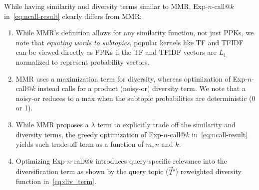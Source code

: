 While having similarity and diversity terms similar to MMR,
Exp-$n$-call@$k$ in~\eqref{eq:ncall-result} clearly differs from MMR:
\begin{enumerate}
\item While MMR's definition allows for any similarity function, not
just PPKs, we note that \emph{equating words to subtopics}, popular
kernels like TF and TFIDF~\cite{salton83Introduction} can be viewed
directly as PPKs if the TF and TFIDF vectors are $L_1$ normalized to
represent probability vectors.
\item MMR uses a maximization term for
diversity, whereas optimization of Exp-$n$-call@$k$ instead calls for
a product (noisy-or) diversity term. %
We note that a noisy-or reduces to a max when the subtopic
probabilities are deterministic (0 or 1).
\item While MMR proposes a $\lambda$ term to explicitly
trade off the similarity and diversity terms, the greedy optimization
of Exp-$n$-call@$k$ in~\eqref{eq:ncall-result} yields such trade-off term
as a function of $m, n$ and $k$.
\item Optimizing Exp-$n$-call@$k$ introduces query-specific relevance into
the diversification term as shown
by the query topic ($\vec{T}'$) reweighted
diversity function in~\eqref{eq:div_term}.
\end{enumerate}

